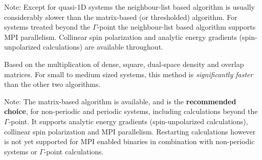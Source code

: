 \begin{description}
\begin{description}
  Note: Except for quasi-1D systems the neighbour-list based algorithm is usually
    considerably slower than the matrix-based (or thresholded) algorithm. For systems
    treated beyond the $\Gamma$-point the neighbour-list based algorithm supports MPI
    parallelism. Collinear spin polarization and analytic energy gradients
    (spin-unpolarized calculations) are available throughout.

  \item[\iscb{MatrixBased}] Based on the multiplication of dense, square, dual-space
    density and overlap matrices. For small to medium sized systems, this method is
    \emph{significantly faster} than the other two algorithms.

  Note: The matrix-based algorithm is available, and is the \textbf{recommended choice},
    for non-periodic and periodic systems, including calculations beyond the
    $\Gamma$-point. It supports analytic energy gradients (spin-unpolarized calculations),
    collinear spin polarization and MPI parallelism. Restarting calculations however is
    not yet supported for MPI enabled binaries in combination with non-periodic systems
    or $\Gamma$-point calculations.
  \end{description}
\end{description}

